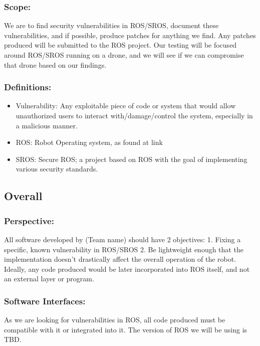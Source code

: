 \documentclass[IEEEtran,letterpaper,10pt,titlepage,draftclsnofoot,onecolumn]{article}
\begin{document}
\subsubsection*{Scope:}
We are to find security vulnerabilities in ROS/SROS, document these vulnerabilities, and if possible, produce patches for anything we find. Any patches produced will be submitted to the ROS project. Our testing will be focused around ROS/SROS running on a drone, and we will see if we can compromise that drone based on our findings.

\subsubsection*{Definitions:}

\begin{itemize}
  \item Vulnerability: Any exploitable piece of code or system that would allow unauthorized users to interact with/damage/control the system, especially in a malicious manner.
  \item ROS: Robot Operating system, as found at link
  \item SROS: Secure ROS; a project based on ROS with the goal of implementing various security standards.
\end{itemize}

\subsection*{Overall}

\subsubsection*{Perspective:}
All software developed by (Team name) should have 2 objectives:
1. Fixing a specific, known vulnerability in ROS/SROS
2. Be lightweight enough that the implementation doesn't drastically affect the overall operation of the robot. Ideally, any code produced would be later incorporated into ROS itself, and not an external layer or program.

\subsubsection*{Software Interfaces:}
As we are looking for vulnerabilities in ROS, all code produced must be compatible with it or integrated into it. The version of ROS we will be using is TBD.
\end{document}
